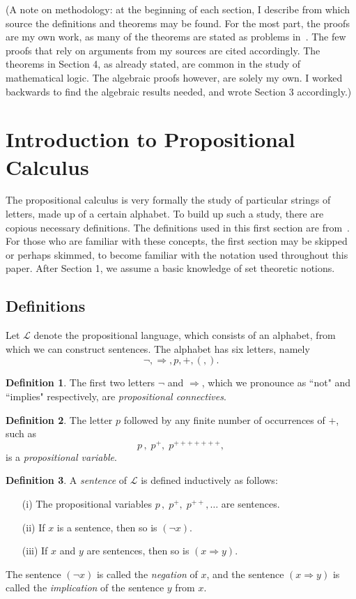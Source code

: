 \documentclass[11pt,titlepage]{article}
\newcommand{\imp}{\Rightarrow}
\newcommand{\Lan}{\mathcal{L}}
\theoremstyle{definition}
\newtheorem{definition}{Definition}[subsection]
\begin{document}
(A note on methodology: at the beginning of each section, I describe from which source the definitions and theorems may be found. For the most part, the proofs are my own work, as many of the theorems are stated as problems in~\cite{Bell}. The few proofs that rely on arguments from my sources are cited accordingly. The theorems in Section 4, as already stated, are common in the study of mathematical logic. The algebraic proofs however, are solely my own. I worked backwards to find the algebraic results needed, and wrote Section 3 accordingly.)

\section{Introduction to Propositional Calculus}\label{intro_prop}


The propositional calculus is very formally the study of particular strings of letters, made up of a certain alphabet. To build up such a study, there are copious necessary definitions. The definitions used in this first section are from~\cite{Halmos}. For those who are familiar with these concepts, the first section may be skipped or perhaps skimmed, to become familiar with the notation used throughout this paper. After Section 1, we assume a basic knowledge of set theoretic notions.

\subsection{Definitions}

Let $\Lan$ denote the propositional language, which consists of an alphabet, from which we can construct sentences. The alphabet has six letters, namely $$\neg, \imp, p, +, (, ).$$
\begin{definition} The first two letters $\neg$ and $\imp$, which we pronounce as ``not" and ``implies" respectively, are \emph{propositional connectives}. \end{definition}
\begin{definition}The letter $p$ followed by any finite number of occurrences of $+$, such as $$p\,, \;p^+,\;p^{+++++++},$$ is a {\em propositional variable}.\end{definition}
\begin{definition} A {\em sentence} of $\Lan$ is defined inductively as follows:
\begin{enumerate}
	\item[(i)]{The propositional variables $p\,, \;p^+,\;p^{++},\ldots$ are sentences.}
	\item[(ii)]{If $x$ is a sentence, then so is $(\neg x)$.}
	\item[(iii)]{If $x$ and $y$ are sentences, then so is $(x\imp y)$.}
\end{enumerate}
The sentence $(\neg x)$ is called the {\em negation} of $x$, and the sentence $(x\imp y)$ is called the {\em implication} of the sentence $y$ from $x$.\end{definition}
\end{document}
